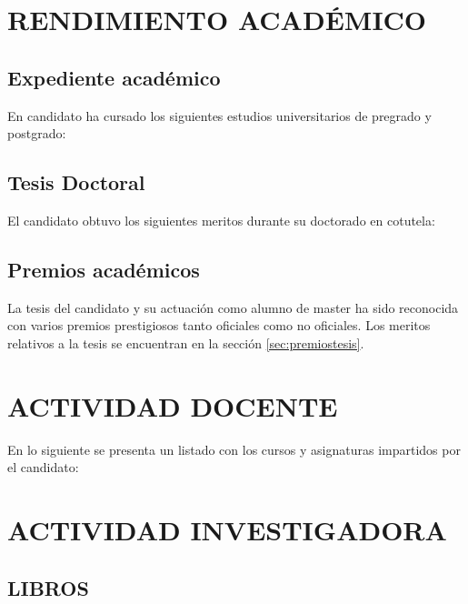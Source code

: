 
\section{RENDIMIENTO ACADÉMICO}

\subsection{Expediente académico}
En candidato ha cursado los siguientes estudios universitarios de pregrado y postgrado:\\

\startitems
{}    
\stopitems
 

\subsection{Tesis Doctoral} 
El candidato obtuvo los siguientes meritos durante su doctorado en cotutela:\\
 
\startitems
{}
\stopitems
 

\subsection{Premios académicos} 	
La tesis del candidato y su actuación como alumno de master ha sido reconocida con varios premios prestigiosos tanto oficiales como no oficiales. Los meritos relativos a la tesis se encuentran en la sección \ref{sec:premiostesis}. \\ 

\startitems 
{} 
\stopitems

\section{ACTIVIDAD DOCENTE}	

En lo siguiente se presenta un listado con los cursos y asignaturas impartidos por el candidato:
\clearpage\thispagestyle{empty}\addtocounter{page}{-1} 
\clearpage
\startitems
\printTeaching
\stopitems

\section{ACTIVIDAD INVESTIGADORA}
\subsection{LIBROS} 
\startitems
{} 
\stopitems

